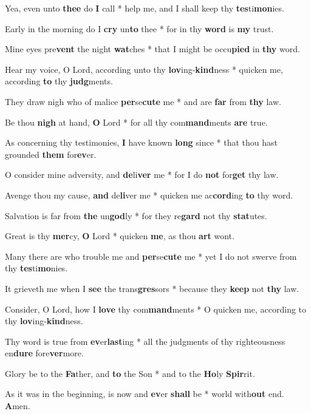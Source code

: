 \begin{multicols}{2}
	Yea, even unto \textbf{thee} do \textbf{I} call * help me, and I shall keep thy \textbf{tes}ti\textbf{mon}ies.
	
	Early in the morning do I \textbf{cry} un\textbf{to} thee * for in thy \textbf{word} is \textbf{my} trust.
	
	Mine eyes pre\textbf{vent} the night \textbf{wat}ches * that I might be occu\textbf{pied} in \textbf{thy} word.
	
	Hear my voice, O Lord, according unto thy \textbf{lov}ing-\textbf{kind}ness * quicken me, according \textbf{to} thy \textbf{judg}ments.
	
	They draw nigh who of malice \textbf{per}se\textbf{cute} me * and are \textbf{far} from \textbf{thy} law.
	
	Be thou \textbf{nigh} at hand, \textbf{O} Lord * for all thy com\textbf{mand}ments \textbf{are} true.
	
	As concerning thy testimonies, \textbf{I} have known \textbf{long} since * that thou hast grounded \textbf{them} for\textbf{ev}er.
	
	O consider mine adversity, and \textbf{de}li\textbf{ver} me * for I do \textbf{not} for\textbf{get} thy law.
	
	Avenge thou my cause, \textbf{and} de\textbf{li}ver me * quicken me ac\textbf{cord}ing \textbf{to} thy word.
	
	Salvation is far from \textbf{the} un\textbf{god}ly * for they re\textbf{gard} not thy \textbf{stat}utes.
	
	Great is thy \textbf{mer}cy, \textbf{O} Lord * quicken \textbf{me}, as thou \textbf{art} wont.
	
	Many there are who trouble me and \textbf{per}se\textbf{cute} me * yet I do not swerve from thy \textbf{tes}ti\textbf{mo}nies.
	
	It grieveth me when I \textbf{see} the trans\textbf{gres}sors * because they \textbf{keep} not \textbf{thy} law.
	
	Consider, O Lord, how I \textbf{love} thy com\textbf{mand}ments * O quicken me, according to thy \textbf{lov}ing-\textbf{kind}ness.
	
	Thy word is true from \textbf{ev}er\textbf{last}ing * all the judgments of thy righteousness en\textbf{dure} fore\textbf{ver}more.
	
	Glory be to the \textbf{Fa}ther, and \textbf{to} the Son * and to the \textbf{Ho}ly \textbf{Spir}rit.
	
	As it was in the beginning, is now and \textbf{ev}er \textbf{shall} be * world with\textbf{out} end. \textbf{A}men.
\end{multicols}